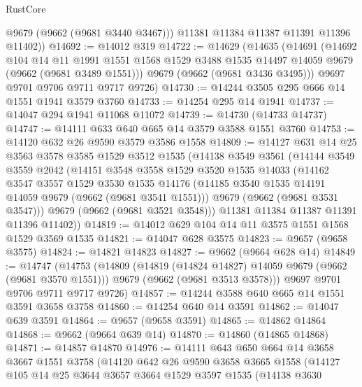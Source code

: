 \begin{lexlean}{RustCore}
\begin{coremodule}
          @9679
          (@9662 (@9681 @3440 @3467)))
        @11381
        @11384
        @11387
        @11391
        @11396
        @11402))
@14692 := @14012 @319
@14722 := @14629
    (@14635
      (@14691
        (@14692
          @104
          @14
          @11
          @1991
          @1551
          @1568
          @1529
          @3488
          @1535
          @14497
          @14059
          @9679
          (@9662 (@9681 @3489 @1551)))
        @9679
        (@9662 (@9681 @3436 @3495)))
      @9697
      @9701
      @9706
      @9711
      @9717
      @9726)
@14730 := @14244 @3505 @295 @666 @14 @1551 @1941 @3579 @3760
@14733 := @14254 @295 @14 @1941
@14737 := @14047 @294 @1941 @11068 @11072
@14739 := @14730 (@14733 @14737)
@14747 := @14111 @633 @640 @665 @14 @3579 @3588 @1551 @3760
@14753 := @14120 @632 @26 @9590 @3579 @3586 @1558
@14809 := @14127
    @631
    @14
    @25
    @3563
    @3578
    @3585
    @1529
    @3512
    @1535
    (@14138
      @3549
      @3561
      (@14144
        @3549
        @3559
        @2042
        (@14151
          @3548
          @3558
          @1529
          @3520
          @1535
          @14033
          (@14162
            @3547
            @3557
            @1529
            @3530
            @1535
            @14176
            (@14185 @3540 @1535 @14191 @14059 @9679 (@9662 (@9681 @3541 @1551)))
            @9679
            (@9662 (@9681 @3531 @3547)))
          @9679
          (@9662 (@9681 @3521 @3548)))
        @11381
        @11384
        @11387
        @11391
        @11396
        @11402))
@14819 := @14012 @629 @104 @14 @11 @3575 @1551 @1568 @1529 @3569 @1535
@14821 := @14047 @628 @3575
@14823 := @9657 (@9658 @3575)
@14824 := @14821 @14823
@14827 := @9662 (@9664 @628 @14)
@14849 := @14747
    (@14753
      (@14809
        (@14819 (@14824 @14827) @14059 @9679 (@9662 (@9681 @3570 @1551)))
        @9679
        (@9662 (@9681 @3513 @3578)))
      @9697
      @9701
      @9706
      @9711
      @9717
      @9726)
@14857 := @14244 @3588 @640 @665 @14 @1551 @3591 @3658 @3758
@14860 := @14254 @640 @14 @3591
@14862 := @14047 @639 @3591
@14864 := @9657 (@9658 @3591)
@14865 := @14862 @14864
@14868 := @9662 (@9664 @639 @14)
@14870 := @14860 (@14865 @14868)
@14871 := @14857 @14870
@14976 := @14111
    @643
    @650
    @664
    @14
    @3658
    @3667
    @1551
    @3758
    (@14120
      @642
      @26
      @9590
      @3658
      @3665
      @1558
      (@14127
        @105
        @14
        @25
        @3644
        @3657
        @3664
        @1529
        @3597
        @1535
        (@14138
          @3630

\end{coremodule}
\end{lexlean}
